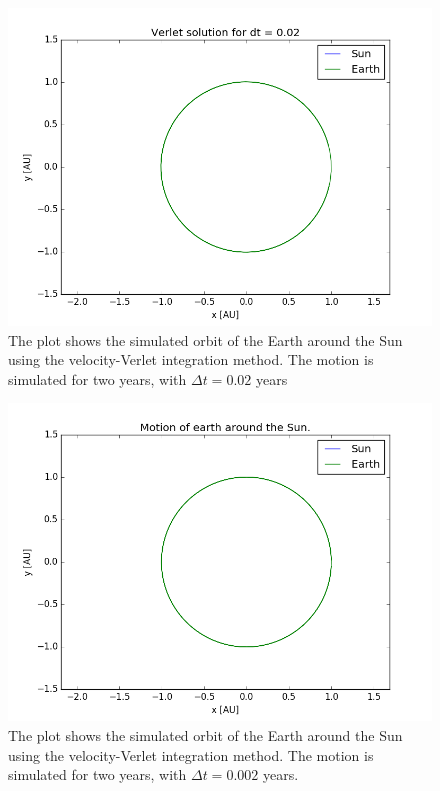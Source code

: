 \begin{figure}[h]
\includegraphics[scale=0.7]{figures/verlet_002}
\caption{The plot shows the simulated orbit of the Earth around the Sun using the velocity-Verlet integration method. The motion is simulated for two years, with $\Delta t = 0.02$ years}
\end{figure}



\begin{figure}[h]
\includegraphics[scale=0.7]{figures/earth_sun_verlet}
\caption{The plot shows the simulated orbit of the Earth around the Sun using the velocity-Verlet integration method. The motion is simulated for two years, with $\Delta t = 0.002$ years.}
\end{figure}

